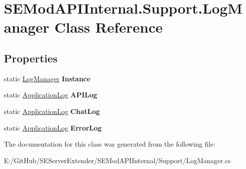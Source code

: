 \hypertarget{class_s_e_mod_a_p_i_internal_1_1_support_1_1_log_manager}{}\section{S\+E\+Mod\+A\+P\+I\+Internal.\+Support.\+Log\+Manager Class Reference}
\label{class_s_e_mod_a_p_i_internal_1_1_support_1_1_log_manager}
\subsection*{Properties}
\begin{DoxyCompactItemize}
\item 
\hypertarget{class_s_e_mod_a_p_i_internal_1_1_support_1_1_log_manager_a94e8f71c80eedfc1644c1b7a9b246279}{}static \hyperlink{class_s_e_mod_a_p_i_internal_1_1_support_1_1_log_manager}{Log\+Manager} {\bfseries Instance}\label{class_s_e_mod_a_p_i_internal_1_1_support_1_1_log_manager_a94e8f71c80eedfc1644c1b7a9b246279}

\item 
\hypertarget{class_s_e_mod_a_p_i_internal_1_1_support_1_1_log_manager_a03379342eef3c45922dae968ea6969bd}{}static \hyperlink{class_s_e_mod_a_p_i_internal_1_1_support_1_1_application_log}{Application\+Log} {\bfseries A\+P\+I\+Log}\label{class_s_e_mod_a_p_i_internal_1_1_support_1_1_log_manager_a03379342eef3c45922dae968ea6969bd}

\item 
\hypertarget{class_s_e_mod_a_p_i_internal_1_1_support_1_1_log_manager_a437ba281cec771acf61ff4b8b001bfe6}{}static \hyperlink{class_s_e_mod_a_p_i_internal_1_1_support_1_1_application_log}{Application\+Log} {\bfseries Chat\+Log}\label{class_s_e_mod_a_p_i_internal_1_1_support_1_1_log_manager_a437ba281cec771acf61ff4b8b001bfe6}

\item 
\hypertarget{class_s_e_mod_a_p_i_internal_1_1_support_1_1_log_manager_a813531587b219c982a5e0fab53b6cb7f}{}static \hyperlink{class_s_e_mod_a_p_i_internal_1_1_support_1_1_application_log}{Application\+Log} {\bfseries Error\+Log}\label{class_s_e_mod_a_p_i_internal_1_1_support_1_1_log_manager_a813531587b219c982a5e0fab53b6cb7f}

\end{DoxyCompactItemize}


The documentation for this class was generated from the following file\+:\begin{DoxyCompactItemize}
\item 
E\+:/\+Git\+Hub/\+S\+E\+Server\+Extender/\+S\+E\+Mod\+A\+P\+I\+Internal/\+Support/Log\+Manager.\+cs\end{DoxyCompactItemize}
